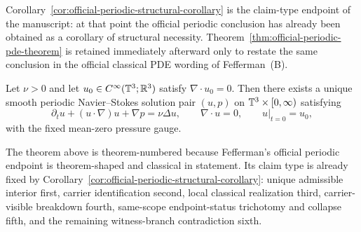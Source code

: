 \begin{remark}\label{rem:endpoint-numbering-convention}
Corollary~\ref{cor:official-periodic-structural-corollary} is the claim-type endpoint of the manuscript: at that point the official periodic conclusion has already been obtained as a corollary of structural necessity. Theorem~\ref{thm:official-periodic-pde-theorem} is retained immediately afterward only to restate the same conclusion in the official classical PDE wording of Fefferman~(B).
\end{remark}

\begin{theorem}\label{thm:official-periodic-pde-theorem}
Let $\nu>0$ and let $u_0\in C^\infty(\mathbb{T}^3;\mathbb{R}^3)$ satisfy $\nabla\cdot u_0=0$. Then there exists a
unique smooth periodic Navier--Stokes solution pair $(u,p)$ on $\mathbb{T}^3\times[0,\infty)$ satisfying
\[
\partial_t u + (u\cdot\nabla)u + \nabla p = \nu\Delta u,
\qquad \nabla\cdot u = 0,
\qquad u|_{t=0}=u_0,
\]
with the fixed mean-zero pressure gauge.
\end{theorem}

\begin{remark}\label{rem:official-theorem-proof-modality}
The theorem above is theorem-numbered because Fefferman's official periodic endpoint is theorem-shaped and classical in statement. Its claim type is already fixed by Corollary~\ref{cor:official-periodic-structural-corollary}: unique admissible interior first, carrier identification second, local classical realization third, carrier-visible breakdown fourth, same-scope endpoint-status trichotomy and collapse fifth, and the remaining witness-branch contradiction sixth.
\end{remark}

